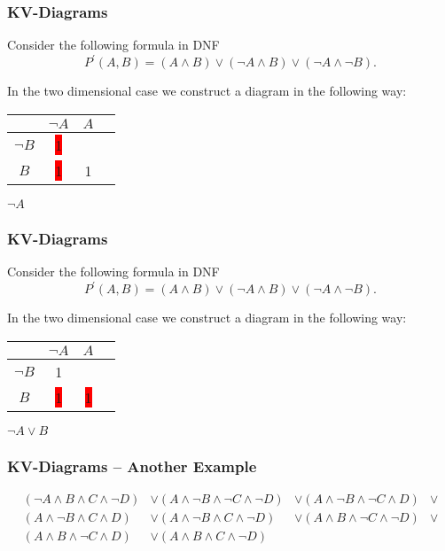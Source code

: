\documentclass{beamer}
\theoremstyle{remark}
\begin{document}
\begin{frame}
	\frametitle{KV-Diagrams}
	Consider the following formula in DNF
	\[ P^{\prime}(A, B) = (A \land B) \lor (\lnot A \land B) \lor (\lnot A \land \lnot B).\]
	
	In the two dimensional case we construct a diagram in the following way:
	
	\vspace{1.5em}
	
	\begin{center}
	\begin{tabular}{c|c|c|c}
		& $\lnot A$ & $A$ \\ \hline
		$\lnot B$ & \colorbox{red}{1} &  \\ \hline
		$B$ & \colorbox{red}{1} &  1\\ \hline
	\end{tabular}
	\end{center}
	
	$\lnot A$
\end{frame}

\begin{frame}
	\frametitle{KV-Diagrams}
	Consider the following formula in DNF
	\[ P^{\prime}(A, B) = (A \land B) \lor (\lnot A \land B) \lor (\lnot A \land \lnot B).\]
	
	In the two dimensional case we construct a diagram in the following way:
	
	\vspace{1.5em}
	
	\begin{center}
	\begin{tabular}{c|c|c|c}
		& $\lnot A$ & $A$ \\ \hline
		$\lnot B$ & 1 &  \\ \hline
		$B$ & \colorbox{red}{1} &  \colorbox{red}{1}\\ \hline
	\end{tabular}
	\end{center}
	
	$\lnot A \lor B$
\end{frame}

\begin{frame}
	\frametitle{KV-Diagrams -- Another Example}
	\begin{example}
		\begin{align*}
			(\lnot A \land B \land C \land \lnot D) & \lor (A \land \lnot B \land \lnot C \land \lnot D) & \lor (A \land \lnot B \land \lnot C \land D) & \lor \\
			(A \land \lnot B \land C \land D) & \lor (A \land \lnot B \land C \land \lnot D) & \lor (A \land B \land \lnot C \land \lnot D) & \lor \\
			(A \land B \land \lnot C \land D) & \lor (A \land B \land C \land \lnot D)
		\end{align*}
	\end{example}
\end{frame}
\end{document}
